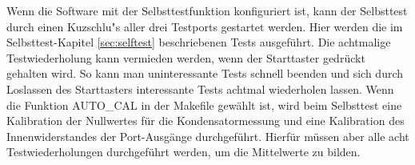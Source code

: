 Wenn die Software mit der Selbsttestfunktion konfiguriert ist, kann der Selbsttest durch einen Kuzschlu"s aller drei
Testports gestartet werden.
Hier werden die im Selbsttest-Kapitel \ref{sec:selftest} beschriebenen Tests ausgef\"uhrt. Die achtmalige Testwiederholung
kann vermieden werden, wenn der Starttaster gedr\"uckt gehalten wird. So kann man uninteressante Tests schnell beenden und
sich durch Loslassen des Starttasters interessante Tests achtmal wiederholen lassen.
Wenn die Funktion AUTO\_CAL in der Makefile gew\"ahlt ist, wird beim Selbsttest eine Kalibration der Nullwertes f\"ur die
Kondensatormessung und eine Kalibration des Innenwiderstandes der Port-Ausg\"ange durchgef\"uhrt. Hierf\"ur m\"ussen aber alle
acht Testwiederholungen durchgef\"uhrt werden, um die Mittelwerte zu bilden.
